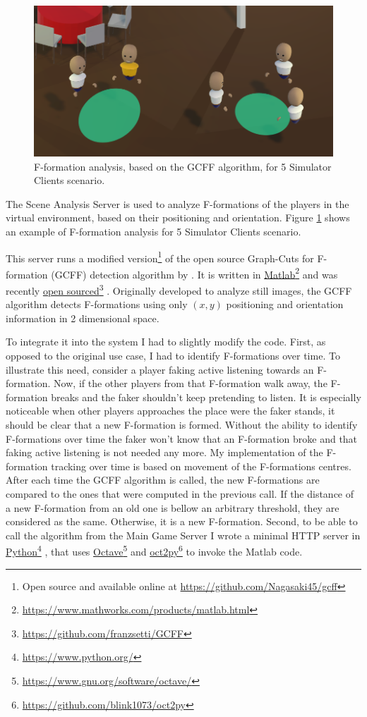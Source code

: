 \documentclass[]{simple-thesis}
\newcommand\fnurl[2]{%
  \href{#2}{#1}\footnote{\url{#2}}%
}
\begin{document}
\begin{figure}
  \centering
  \includegraphics[width=\textwidth]{../graphics/simulator_f_formation.png}
  \caption{F-formation analysis, based on the GCFF algorithm, for 5 Simulator Clients scenario.}
  \label{fig:system:simulator_f_formation}
\end{figure}

The Scene Analysis Server is used to analyze F-formations of the players in the virtual environment, based on their positioning and orientation.
Figure \ref{fig:system:simulator_f_formation} shows an example of F-formation analysis for 5 Simulator Clients scenario.

This server runs a modified version\footnote{Open source and available online at \url{https://github.com/Nagasaki45/gcff}} of the open source Graph-Cuts for F-formation (GCFF) detection algorithm by \cite{Setti2015}.
It is written in \fnurl{Matlab}{https://www.mathworks.com/products/matlab.html} and was recently \fnurl{open sourced}{https://github.com/franzsetti/GCFF}.
Originally developed to analyze still images, the GCFF algorithm detects F-formations using only $(x, y)$ positioning and orientation information in 2 dimensional space.

To integrate it into the system I had to slightly modify the code.
First, as opposed to the original use case, I had to identify F-formations over time.
To illustrate this need, consider a player faking active listening towards an F-formation.
Now, if the other players from that F-formation walk away, the F-formation breaks and the faker shouldn't keep pretending to listen.
It is especially noticeable when other players approaches the place were the faker stands, it should be clear that a new F-formation is formed.
Without the ability to identify F-formations over time the faker won't know that an F-formation broke and that faking active listening is not needed any more.
My implementation of the F-formation tracking over time is based on movement of the F-formations centres.
After each time the GCFF algorithm is called, the new F-formations are compared to the ones that were computed in the previous call.
If the distance of a new F-formation from an old one is bellow an arbitrary threshold, they are considered as the same.
Otherwise, it is a new F-formation.
Second, to be able to call the algorithm from the Main Game Server I wrote a minimal HTTP server in \fnurl{Python}{https://www.python.org/}, that uses \fnurl{Octave}{https://www.gnu.org/software/octave/} and \fnurl{oct2py}{https://github.com/blink1073/oct2py} to invoke the Matlab code.
\end{document}
